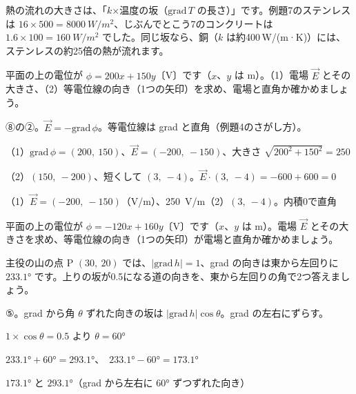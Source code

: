 熱の流れの大きさは、「$k$×温度の坂（$\mathrm{grad}\,T$ の長さ）」です。例題7のステンレスは $16\times500=\qty{8000}{W/m^2}$、じぶんでとこう7のコンクリートは $1.6\times100=\qty{160}{W/m^2}$ でした。同じ坂なら、銅（$k$ は約400\,W/(m·K)）には、ステンレスの約25倍の熱が流れます。

\begin{reidai}[電位から電場を求める]
平面の上の電位が $\phi=200x+150y$〔V〕です（$x$、$y$ は m）。（1）電場 $\vec E$ とその大きさ、（2）等電位線の向き（1つの矢印）を求め、電場と直角か確かめましょう。\par
\kangaekata ⑧の②。$\vec E=-\mathrm{grad}\,\phi$。等電位線は grad と直角（例題4のさがし方）。\par
\shiki\kviiies{}\zw{} （1）$\mathrm{grad}\,\phi=(200,\ 150)$、$\vec E=(-200,\ -150)$、大きさ $\sqrt{200^2+150^2}=250$\par
\kviiiea （2）$(150,\ -200)$、短くして $(3,\ -4)$。$\vec E\cdot(3,\ -4)=-600+600=0$\par
\kotae\kviiies{}\zw{} （1）$\vec E=(-200,\ -150)$（V/m）、\qty{250}{V/m}\quad （2）$(3,\ -4)$。内積0で直角
\end{reidai}

\begin{jibun}
平面の上の電位が $\phi=-120x+160y$〔V〕です（$x$、$y$ は m）。電場 $\vec E$ とその大きさを求め、等電位線の向き（1つの矢印）が電場と直角か確かめましょう。
\end{jibun}

\begin{reidai}[坂をゆるくする道の向き]
主役の山の点 P $(30,\ 20)$ では、$|\mathrm{grad}\,h|=1$、grad の向きは東から左回りに $233.1°$ です。上りの坂が0.5になる道の向きを、東から左回りの角で2つ答えましょう。\par
\kangaekata ⑤。grad から角 $\theta$ ずれた向きの坂は $|\mathrm{grad}\,h|\cos\theta$。grad の左右にずらす。\par
\shiki\kviiies{}\zw{} $1\times\cos\theta=0.5$ より $\theta=60°$\par
\kviiiea $233.1°+60°=293.1°$、\ $233.1°-60°=173.1°$\par
\kotae\kviiies{}\zw{} $173.1°$ と $293.1°$（grad から左右に $60°$ ずつずれた向き）
\end{reidai}

